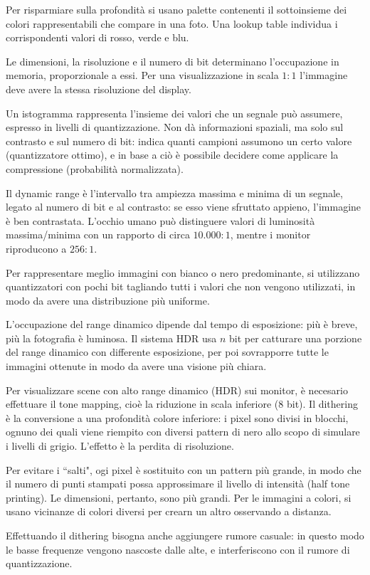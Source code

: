 Per risparmiare sulla profondità si usano palette contenenti il sottoinsieme dei colori rappresentabili che compare in una foto. Una lookup table individua i corrispondenti valori di rosso, verde e blu.

Le dimensioni, la risoluzione e il numero di bit determinano l'occupazione in memoria, proporzionale a essi. Per una visualizzazione in scala $1 : 1$ l'immagine deve avere la stessa risoluzione del display.

Un istogramma rappresenta l'insieme dei valori che un segnale può assumere, espresso in livelli di quantizzazione. Non dà informazioni spaziali, ma solo sul contrasto e sul numero di bit: indica quanti campioni assumono un certo valore (quantizzatore ottimo), e in base a ciò è possibile decidere come applicare la compressione (probabilità normalizzata).

Il dynamic range è l'intervallo tra ampiezza massima e minima di un segnale, legato al numero di bit e al contrasto: se esso viene sfruttato appieno, l'immagine è ben contrastata. L'occhio umano può distinguere valori di luminosità massima/minima con un rapporto di circa $10.000 : 1$, mentre i monitor riproducono a $256 : 1$.

Per rappresentare meglio immagini con bianco o nero predominante, si utilizzano quantizzatori con pochi bit tagliando tutti i valori che non vengono utilizzati, in modo da avere una distribuzione più uniforme. 

L'occupazione del range dinamico dipende dal tempo di esposizione: più è breve, più la fotografia è luminosa. Il sistema HDR usa $n$ bit per catturare una porzione del range dinamico con differente esposizione, per poi sovrapporre tutte le immagini ottenute in modo da avere una visione più chiara. 

Per visualizzare scene con alto range dinamico (HDR) sui monitor, è necesario effettuare il tone mapping, cioè la riduzione in scala inferiore (8 bit). Il dithering è la conversione a una profondità colore inferiore: i pixel sono divisi in blocchi, ognuno dei quali viene riempito con diversi pattern di nero allo scopo di simulare i livelli di grigio. L'effetto è la perdita di risoluzione.

Per evitare i ``salti", ogi pixel è sostituito con un pattern più grande, in modo che il numero di punti stampati possa approssimare il livello di intensità (half tone printing). Le dimensioni, pertanto, sono più grandi. Per le immagini a colori, si usano vicinanze di colori diversi per crearn un altro osservando a distanza. 

Effettuando il dithering bisogna anche aggiungere rumore casuale: in questo modo le basse frequenze vengono nascoste dalle alte, e interferiscono con il rumore di quantizzazione.








